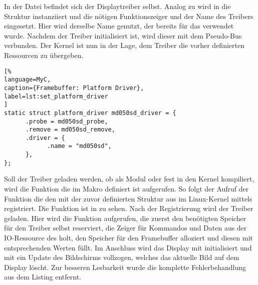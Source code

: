 In der Datei  befindet sich der Displaytreiber selbst. Analog zu  wird in  die Struktur instanziiert und die nötigen Funktionszeiger und der Name des Treibers eingesetzt. Hier wird derselbe Name genutzt, der bereits für das  verwendet wurde. Nachdem der Treiber initialisiert ist, wird dieser mit dem Pseudo-Bus verbunden. Der Kernel ist nun in der Lage, dem Treiber die vorher definierten Ressourcen zu übergeben.

\begin{lstlisting}[%
language=MyC,
caption={Framebuffer: Platform Driver},
label=lst:set_platform_driver
]
static struct platform_driver md050sd_driver = {
      .probe = md050sd_probe,
      .remove = md050sd_remove,
      .driver = {
            .name = "md050sd",
      },
};
\end{lstlisting}

Soll der Treiber geladen werden, ob als Modul oder fest in den Kernel kompiliert, wird die Funktion die im Makro  definiert ist aufgerufen. So folgt der Aufruf der Funktion  die den  mit der zuvor definierten Struktur  aus  im Linux-Kernel mittels 
 registriert. Die Funktion  ist in  zu sehen. 
Nach der Registrierung wird der Treiber geladen. Hier wird die Funktion  aufgerufen, die zuerst den benötigten Speicher für den Treiber selbst reserviert, die Zeiger für Kommandos und Daten aus der IO-Ressource des  holt, den Speicher für den Framebuffer alloziert und diesen mit entsprechenden Werten füllt. Im Anschluss wird das Display mit  initialisiert und mit  ein Update des Bildschirms vollzogen, welches das aktuelle Bild auf dem Display löscht. Zur besseren Lesbarkeit wurde die komplette Fehlerbehandlung aus dem Listing entfernt. 

